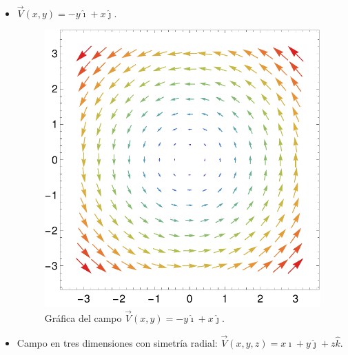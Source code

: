 \begin{ejemplo}
\ 

    \begin{itemize}
        \item $\vec{V}(x,y) = -y \hat{\imath} + x \hat{\jmath}$.

        \begin{figure}[H]
            \centering
            \includegraphics[scale = 0.45]{Figuras/CampoVectorial1.pdf}
            \caption{Gráfica del campo $\vec{V}(x,y) = -y \hat{\imath} + x \hat{\jmath}$.}
            \label{fig:Campo_Vectorial1}
        \end{figure}

        \item Campo en tres dimensiones con simetría radial: $\vec{V}(x,y,z) = x \hat{\imath} + y \hat{\jmath} + z \hat{k}$.


\end{itemize}
\end{ejemplo}
